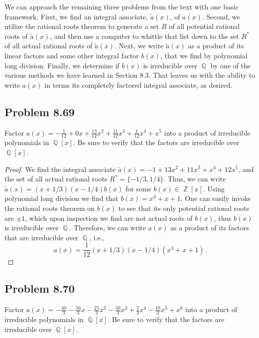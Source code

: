 \documentclass[letterpaper, 12pt]{amsart}
\DeclareMathOperator{\Z}{\mathbb{Z}}
\DeclareMathOperator{\Q}{\mathbb{Q}}
\begin{document}
		We can approach the remaining three problems from the text with one basic framework.
		First, we find an integral associate, $\tilde{a}(x)$, of $a(x)$.
		Second, we utilize the rational roots theorem to generate a set $R$ of all potential rational roots of $\tilde{a}(x)$, and then use a computer to whittle that list down to the set $R^{*}$ of all actual rational roots of $\tilde{a}(x)$.
		Next, we write $\tilde{a}(x)$ as a product of its linear factors and some other integral factor $b(x)$, that we find by polynomial long division.
		Finally, we determine if $b(x)$ is irreducible over $\Q$ by one of the various methods we have learned in Section 8.3.
		That leaves us with the ability to write $a(x)$ in terms its completely factored integral associate, as desired.

		\subsection*{Problem 8.69}
		\label{sub:problem_8_69}
		Factor $a(x) = -\frac{1}{12} + 0x + \frac{13}{12}x^{2} + \frac{11}{12}x^{3} + \frac{1}{12}x^{4} + x^{5}$ into a product of irreducible polynomials in $\Q[x]$.
		Be sure to verify that the factors are irreducible over $\Q[x]$.

		\begin{proof}
		We find the integral associate $\tilde{a}(x) = -1 + 13x^{2} + 11x^{3} + x^{4} + 12x^{5}$, and the set of all actual rational roots $R^{*} = \{ -1/3, 1/4 \}$.
		Thus, we can write $\tilde{a}(x) = (x + 1/3)(x - 1/4)b(x)$ for some $b(x) \in \Z[x]$.
		Using polynomial long division we find that $b(x) = x^{3} + x + 1$.
		One can easily invoke the rational roots theorem on $b(x)$ to see that its only potential rational roots are $\pm 1$, which upon inspection we find are not actual roots of $b(x)$, thus $b(x)$ is irreducible over $\Q$.
		Therefore, we can write $a(x)$ as a product of its factors that are irreducible over $\Q$, i.e., $$a(x) = \frac{1}{12} (x + 1/3)(x - 1/4)(x^{3} + x + 1).$$
		\end{proof}

		\subsection*{Problem 8.70}
		\label{sub:problem_8_70}
		Factor $a(x) = -\frac{40}{3} - \frac{50}{3}x - \frac{25}{3}x^{2} - \frac{50}{3}x^{3} + \frac{7}{3}x^{4} - \frac{10}{3}x^{5} + x^{6}$ into a product of irreducible polynomials in $\Q[x]$.
		Be sure to verify that the factors are irreducible over $\Q[x]$.
\end{document}
